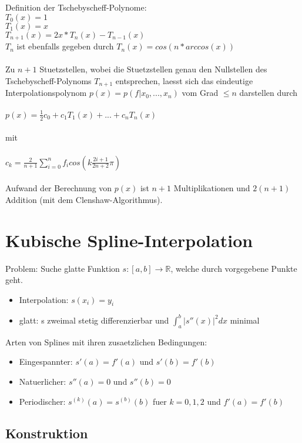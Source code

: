 \documentclass[a4paper]{scrreprt}
\begin{document}
Definition der Tschebyscheff-Polynome:\\
$T_0(x) = 1$\\
$T_1(x) = x$\\
$T_{n+1}(x) = 2x * T_n(x)-T_{n-1}(x)$\\

$T_n$ ist ebenfalls gegeben durch $T_n(x) = cos(n*arccos(x))$\\\\

Zu $n+1$ Stuetzstellen, wobei die Stuetzstellen genau den Nullstellen des Tschebyscheff-Polynoms $T_{n+1}$ entsprechen, laesst sich das eindeutige Interpolationspolynom $p(x) = p(f|x_0,...,x_n)$ vom Grad $\leq n$ darstellen durch\\\\
$p(x) = \frac{1}{2}c_0+c_1T_1(x) + ...+ c_nT_n(x)$\\\\
mit\\\\
$c_k = \frac{2}{n+1}\sum_{i=0}^nf_icos(k\frac{2i+1}{2n+2}\pi)$\\\\
Aufwand der Berechnung von $p(x)$ ist $n+1$ Multiplikationen und $2(n+1)$ Addition (mit dem Clenshaw-Algorithmus).

\section{Kubische Spline-Interpolation}

Problem: Suche glatte Funktion $s:[a,b]\rightarrow\mathbb{R}$, welche durch vorgegebene Punkte geht.
\begin{itemize}
	\item Interpolation: $s(x_i) = y_i$
	\item glatt: s zweimal stetig differenzierbar und $\int_a^b|s''(x)|^2dx$ minimal
\end{itemize}

Arten von Splines mit ihren zusaetzlichen Bedingungen:

\begin{itemize}
	\item Eingespannter: $s'(a) = f'(a)$ und $s'(b) = f'(b)$
	\item Natuerlicher: $s''(a) = 0$ und $s''(b) = 0$
	\item Periodischer: $s^{(k)}(a) = s^{(b)}(b)$ fuer $k = 0,1,2$ und $f'(a) = f'(b)$
\end{itemize}

\subsection{Konstruktion}
\end{document}
